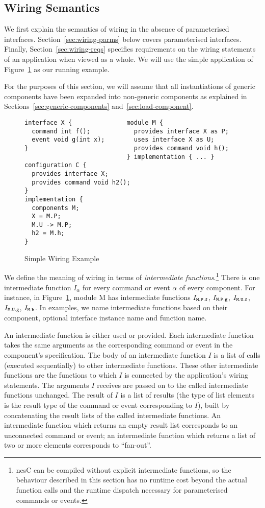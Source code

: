 \documentclass[11pt,letterpaper]{article}
\newcommand{\code}[1]{{\tt #1}}
\newcommand{\nesc}{nesC\xspace}
\begin{document}
\subsection{Wiring Semantics}
\label{sec:wiring-semantics}

We first explain the semantics of wiring in the absence of parameterised
interfaces. Section~\ref{sec:wiring-parms} below covers parameterised
interfaces. Finally, Section~\ref{sec:wiring-reqs} specifies requirements
on the wiring statements of an application when viewed as a whole. We will
use the simple application of Figure~\ref{fig:wiring} as our running
example.

For the purposes of this section, we will assume that all instantiations of
generic components have been expanded into non-generic components as
explained in Sections~\ref{sec:generic-components}
and~\ref{sec:load-component}.

\begin{figure}
\begin{verbatim}
interface X {               module M {
  command int f();            provides interface X as P;
  event void g(int x);        uses interface X as U;
}                             provides command void h();
                            } implementation { ... }
configuration C {
  provides interface X;
  provides command void h2();
}
implementation {
  components M;
  X = M.P;
  M.U -> M.P;
  h2 = M.h;
}  
\end{verbatim}
\caption{Simple Wiring Example}
\label{fig:wiring}
\end{figure}

We define the meaning of wiring in terms of \emph{intermediate
functions}.\footnote{\nesc can be compiled without explicit intermediate
functions, so the behaviour described in this section has no runtime cost
beyond the actual function calls and the runtime dispatch necessary for
parameterised commands or events.}  There is one intermediate function
$I_\alpha$ for every command or event $\alpha$ of every component. For
instance, in Figure~\ref{fig:wiring}, module M has intermediate functions
$I_\code{M.P.f}$, $I_\code{M.P.g}$, $I_\code{M.U.f}$, $I_\code{M.U.g}$,
$I_\code{M.h}$.  In examples, we name intermediate functions based on their
component, optional interface instance name and function name.

An intermediate function is either used or provided. Each intermediate
function takes the same arguments as the corresponding command or event in
the component's specification. The body of an intermediate function $I$ is
a list of calls (executed sequentially) to other intermediate
functions. These other intermediate functions are the functions to which
$I$ is connected by the application's wiring statements. The arguments $I$
receives are passed on to the called intermediate functions unchanged. The
result of $I$ is a list of results (the type of list elements is the result
type of the command or event corresponding to $I$), built by concatenating
the result lists of the called intermediate functions. An intermediate
function which returns an empty result list corresponds to an unconnected
command or event; an intermediate function which returns a list of two or
more elements corresponds to ``fan-out''.
\end{document}
